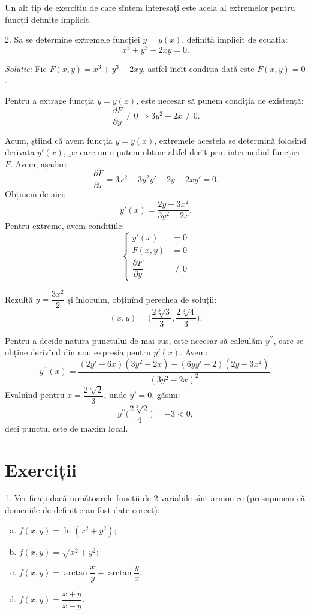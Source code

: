 \vspace{0.5cm}

Un alt tip de exercițiu de care sîntem interesați este acela al extremelor pentru
funcții definite implicit.

2. Să se determine extremele funcției $ y = y(x) $, definită implicit de ecuația:
\[
  x^3 + y^3 - 2xy = 0.
\]

\emph{Soluție:} Fie $ F(x, y) = x^3 + y^3 - 2xy $, astfel încît condiția dată
este $ F(x, y) = 0 $.

Pentru a extrage funcția $ y = y(x) $, este necesar să punem condiția
de existență:
\[
  \dfrac{\partial F}{\partial y} \neq 0 \Rightarrow 3y^2 - 2x \neq 0.
\]

Acum, știind că avem funcția $ y = y(x) $, extremele acesteia se determină
folosind derivata $ y'(x) $, pe care nu o putem obține altfel decît prin
intermediul funcției $ F $. Avem, așadar:
\[
  \frac{\partial F}{\partial x} = 3x^2 - 3y^2 y' - 2y - 2x y' = 0.
\]
Obținem de aici:
\[
  y'(x) = \frac{2y - 3x^2}{3y^2 - 2x}.
\]
Pentru extreme, avem condițiile:
\[
  \begin{cases}
    y'(x) &= 0 \\
    F(x, y) &= 0 \\
    \dfrac{\partial F}{\partial y} &\neq 0
  \end{cases}
\]

Rezultă $ y = \dfrac{3x^2}{2} $ și înlocuim, obținînd perechea de soluții:
\[
  (x, y) = \Big( \dfrac{2\sqrt[3]{3}}{3}, \dfrac{2\sqrt[3]{4}}{3} \Big).
\]

Pentru a decide natura punctului de mai sus, este necesar să calculăm
$ y^{\prime\prime} $, care se obține derivînd din nou expresia pentru $ y'(x) $.
Avem:
\[
  y^{\prime\prime}(x) = \frac{(2y' - 6x)(3y^2 - 2x) - (6yy' - 2)(2y - 3x^2)}{(3y^2 - 2x)^2}.
\]
Evaluînd pentru $ x = \dfrac{2 \sqrt[3]{2}}{3} $, unde $ y' = 0 $, găsim:
\[
  y^{\prime\prime}\Big( \dfrac{2 \sqrt[3]{2}}{4} \Big) = -3 < 0,
\]
deci punctul este de maxim local.


\section{Exerciții}

1. Verificați dacă următoarele funcții de 2 variabile sînt armonice (presupunem
că domeniile de definiție au fost date corect):
\begin{enumerate}[(a)]
\item $ f(x, y) = \ln(x^2 + y^2) $;
\item $ f(x, y) = \sqrt{x^2 + y^2} $;
\item $ f(x, y) = \arctan \dfrac{x}{y} + \arctan\dfrac{y}{x} $;
\item $ f(x, y) = \dfrac{x + y}{x - y} $.
\end{enumerate}

